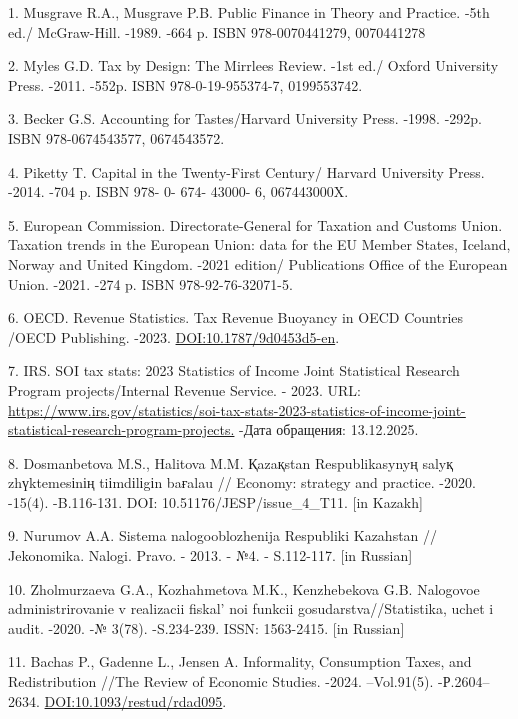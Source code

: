 \begin{refs}
1. Musgrave R.A., Musgrave P.B. Public Finance in Theory and Practice.
-5th ed./ McGraw-Hill. -1989. -664 p. ISBN 978-0070441279, 0070441278

2. Myles G.D. Tax by Design: The Mirrlees Review. -1st ed./ Oxford
University Press. -2011. -552p. ISBN 978-0-19-955374-7, 0199553742.

3. Becker G.S. Accounting for Tastes/Harvard University Press. -1998.
-292p. ISBN 978-0674543577, 0674543572.

4. Piketty T. Capital in the Twenty-First Century/ Harvard University
Press. -2014. -704 p. ISBN 978- 0- 674- 43000- 6, 067443000X.

5. European Commission. Directorate-General for Taxation and Customs
Union. Taxation trends in the European Union: data for the EU Member
States, Iceland, Norway and United Kingdom. -2021 edition/ Publications
Office of the European Union. -2021. -274 p. ISBN 978-92-76-32071-5.

6. OECD. Revenue Statistics. Tax Revenue Buoyancy in OECD Countries
/OECD Publishing. -2023.
\href{https://doi.org/10.1787/9d0453d5-en}{DOI:10.1787/9d0453d5-en}.

7. IRS. SOI tax stats: 2023 Statistics of Income Joint Statistical
Research Program projects/Internal Revenue Service. - 2023. URL:
\href{https://www.irs.gov/statistics/soi-tax-stats-2023-statistics-of-income-joint-statistical-research-program-projects.\%20}{https://www.irs.gov/statistics/soi-tax-stats-2023-statistics-of-income-joint-statistical-research-program-projects.}
-Дата обращения: 13.12.2025.

8. Dosmanbetova M.S., Halitova M.M. Қazaқstan Respublikasynyң salyқ
zhүktemesіnің tiіmdіlіgіn baғalau // Economy: strategy and practice.
-2020. -15(4). -B.116-131. DOI: 10.51176/JESP/issue\_4\_T11. {[}in
Kazakh{]}

9. Nurumov A.A. Sistema nalogooblozhenija Respubliki Kazahstan //
Jekonomika. Nalogi. Pravo. - 2013. - №4. - S.112-117. {[}in Russian{]}

10. Zholmurzaeva G.A., Kozhahmetova M.K., Kenzhebekova G.B. Nalogovoe
administrirovanie v realizacii fiskal' noi funkcii
gosudarstva//Statistika, uchet i audit. -2020. -№ 3(78). -S.234-239.
ISSN: 1563-2415. {[}in Russian{]}

11. Bachas P., Gadenne L., Jensen A. Informality, Consumption Taxes, and
Redistribution //The Review of Economic Studies. -2024. --Vol.91(5).
-Р.2604--2634.
\href{https://doi.org/10.1093/restud/rdad095}{DOI:10.1093/restud/rdad095}.


\end{refs}
